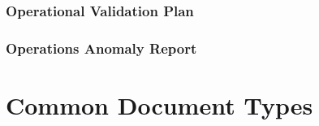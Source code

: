 \subsubsection{Operational Validation Plan}
\label{app:Operational Validation Plan}

\subsubsection{Operations Anomaly Report}
\label{app:Operations Anomaly Report}

\clearpage
\section{Common Document Types}
\label{app:Common Document Types}

